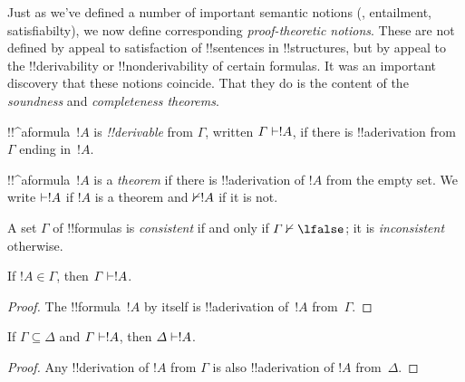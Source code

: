 \documentclass[../../../include/open-logic-section]{subfiles}
\begin{document}
      {}
      {}


\begin{explain}
Just as we've defined a number of important semantic notions
(, entailment, satisfiabilty), we now
define corresponding \emph{proof-theoretic notions}.  These are not
defined by appeal to satisfaction of !!{sentence}s in !!{structure}s,
but by appeal to the !!{derivability} or !!{nonderivability} of
certain formulas.  It was an important discovery that these notions
coincide.  That they do is the content of the \emph{soundness} and
\emph{completeness theorems}.
\end{explain}

\begin{defn}[!!^{derivability}]
!!^a{formula}~$!A$ is \emph{!!{derivable}} from $\Gamma$, written
$\Gamma \Proves !A$, if there is !!a{derivation} from~$\Gamma$ ending
in~$!A$.
\end{defn}

\begin{defn}[Theorems]
!!^a{formula}~$!A$ is a \emph{theorem} if there is !!a{derivation} of
$!A$ from the empty set.  We write $\Proves !A$ if $!A$ is a theorem
and $\Proves/ !A$ if it is not.
\end{defn}

\begin{defn}[Consistency]
A set $\Gamma$ of !!{formula}s is \emph{consistent} if and only if
$\Gamma\Proves/ \lfalse$; it is \emph{inconsistent} otherwise.
\end{defn}

\begin{prop}[Reflexivity]
If $!A \in \Gamma$, then $\Gamma \Proves !A$.
\end{prop}

\begin{proof}
  The !!{formula}~$!A$ by itself is !!a{derivation} of~$!A$ from~$\Gamma$.
\end{proof}

\begin{prop}[Monotony]
If $\Gamma \subseteq \Delta$ and $\Gamma \Proves !A$, then $\Delta
\Proves !A$.
\end{prop}

\begin{proof}
Any !!{derivation} of $!A$ from $\Gamma$ is also !!a{derivation} of
$!A$ from~$\Delta$.
\end{proof}
\end{document}

